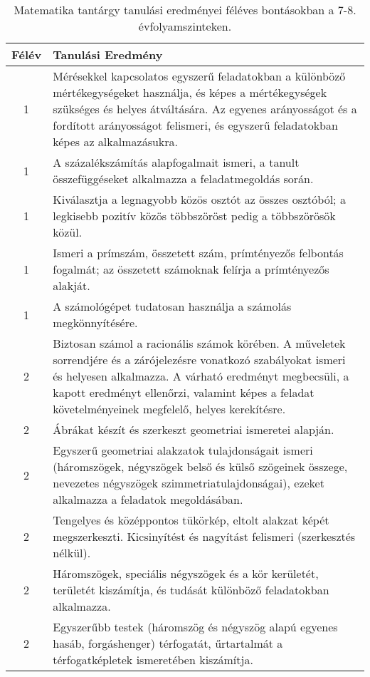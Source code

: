        
           \begin{longtable}{c | p{12cm} }
            \caption[Matematika 7-8.]{Matematika tantárgy tanulási eredményei féléves bontásokban a 7-8. évfolyamszinteken. }  \\

            \textbf{Félév} & \textbf{Tanulási Eredmény} \\
            \hline
            \endhead
                                
                                          1 &  Mérésekkel kapcsolatos egyszerű feladatokban a különböző mértékegységeket használja, és képes a mértékegységek szükséges és helyes átváltására. Az egyenes arányosságot és a fordított arányosságot felismeri, és egyszerű feladatokban képes az alkalmazásukra.
 \\ \hline
                                          1 &  A százalékszámítás alapfogalmait ismeri, a tanult összefüggéseket alkalmazza a  feladatmegoldás során. \\ \hline
                                          1 &  Kiválasztja a legnagyobb közös osztót az összes osztóból; a legkisebb pozitív közös többszöröst pedig a többszörösök közül. \\ \hline
                                          1 &  Ismeri a prímszám, összetett szám, prímtényezős felbontás fogalmát; az összetett számoknak felírja a prímtényezős alakját. \\ \hline
                                          1 &  A számológépet tudatosan használja a számolás megkönnyítésére. \\ \hline
                                      
                                
                                          2 &  Biztosan számol a racionális számok körében. A műveletek sorrendjére és a zárójelezésre vonatkozó szabályokat ismeri és helyesen alkalmazza. A várható eredményt megbecsüli, a kapott  eredményt ellenőrzi, valamint képes a feladat követelményeinek megfelelő, helyes kerekítésre. \\ \hline
                                          2 &  Ábrákat készít és szerkeszt geometriai ismeretei alapján. \\ \hline
                                          2 &  Egyszerű geometriai alakzatok tulajdonságait ismeri (háromszögek, négyszögek belső és külső szögeinek összege, nevezetes négyszögek szimmetriatulajdonságai), ezeket alkalmazza a feladatok megoldásában. \\ \hline
                                          2 &  Tengelyes és középpontos tükörkép, eltolt alakzat képét megszerkeszti. Kicsinyítést és nagyítást felismeri (szerkesztés nélkül). \\ \hline
                                          2 &  Háromszögek, speciális négyszögek és a kör kerületét, területét kiszámítja, és tudását különböző feladatokban alkalmazza. \\ \hline
                                          2 &  Egyszerűbb testek (háromszög és négyszög alapú egyenes hasáb, forgáshenger) térfogatát, űrtartalmát a térfogatképletek ismeretében kiszámítja. \\ \hline
                                      

\end{longtable}

